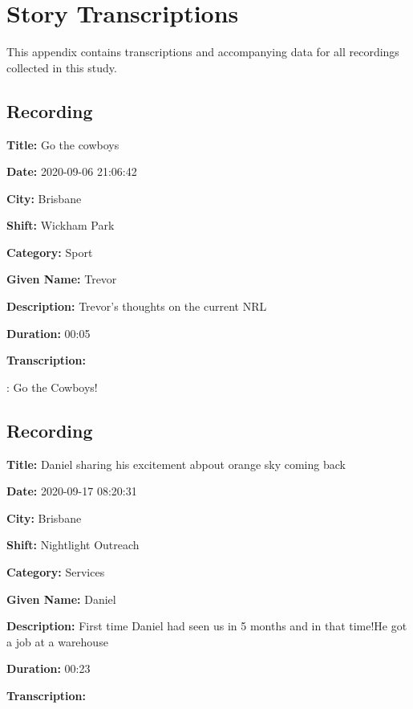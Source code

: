 {
\setlength{\parindent}{0em}

\chapter{Story Transcriptions}
\label{appendix:transcriptions}

This appendix contains transcriptions and accompanying data for all recordings collected in this study.

\tocless\section{Recording }

\textbf{Title:} Go the cowboys

\textbf{Date:} 2020-09-06 21:06:42

\textbf{City:} Brisbane

\textbf{Shift:} Wickham Park

\textbf{Category:} Sport

\textbf{Given Name:} Trevor

\textbf{Description:} Trevor's thoughts on the current NRL

\textbf{Duration:} 00:05

\textbf{Transcription:}

\begin{drama}

    \trevspeaks: Go the Cowboys!
\end{drama}

\tocless\section{Recording }

\textbf{Title:} Daniel sharing his excitement abpout orange sky coming back

\textbf{Date:} 2020-09-17 08:20:31

\textbf{City:} Brisbane

\textbf{Shift:} Nightlight Outreach

\textbf{Category:} Services

\textbf{Given Name:} Daniel

\textbf{Description:} First time Daniel had seen us in 5 months and in that time!He got a job at a warehouse

\textbf{Duration:} 00:23

\textbf{Transcription:}

}
